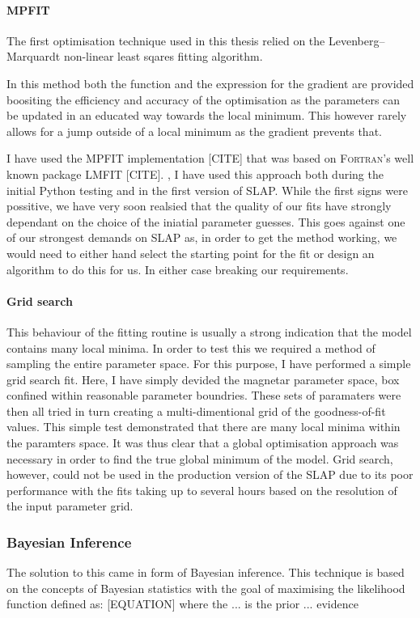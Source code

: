 \paragraph{MPFIT}
The first optimisation technique used in this thesis relied on the Levenberg–Marquardt non-linear least sqares fitting algorithm.

In this method both the function and the expression for the gradient are provided boositing the efficiency and accuracy of the  optimisation as the parameters can be updated in an educated way towards the local minimum. This however rarely allows for a jump outside of a local minimum as the gradient prevents that.

I have used the \textsc{MPFIT} implementation [CITE] that was based on \textsc{Fortran}'s well known package \textsc{LMFIT} [CITE]. , I have used this approach both during the initial Python testing and in the first version of SLAP. While the first signs were possitive, we have very soon realsied that the quality of our fits have strongly dependant on the choice of the iniatial parameter guesses. This goes against one of our strongest demands on SLAP as, in order to get the method working, we would need to either hand select the starting point for the fit or design an algorithm to do this for us. In either case breaking our requirements.

\paragraph{Grid search}
This behaviour of the fitting routine is usually a strong indication that the model contains many local minima. In order to test this we required a method of sampling the entire parameter space. For this purpose, I have performed a simple grid search fit. Here, I have simply devided the magnetar parameter space, box confined within reasonable parameter boundries. These sets of paramaters were then all tried in turn creating a multi-dimentional grid of the goodness-of-fit values. This simple test demonstrated that there are many local minima within the paramters space. It was thus clear that a global optimisation approach was necessary in order to find the true global minimum of the model. Grid search, however, could not be used in the production version of the \textsc{SLAP} due to its poor performance with the fits taking up to several hours based on the resolution of the input parameter grid.

\subsubsection{Bayesian Inference}
The solution to this came in form of Bayesian inference. This technique is based on the concepts of Bayesian statistics with the goal of maximising the likelihood function defined as:
[EQUATION]
\noindent where the ... is the prior ... evidence

